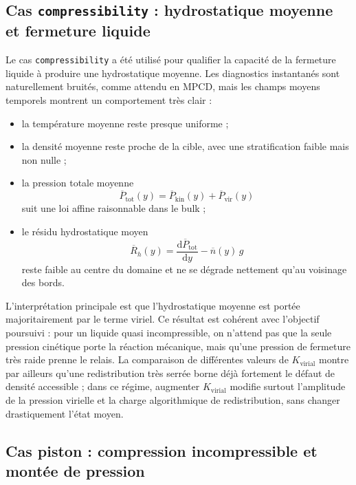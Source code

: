 \documentclass[11pt,a4paper]{article}
\begin{document}
\subsection{Cas \texttt{compressibility} : hydrostatique moyenne et fermeture liquide}

Le cas \texttt{compressibility} a été utilisé pour qualifier la capacité de la fermeture liquide à produire une hydrostatique moyenne. Les diagnostics instantanés sont naturellement bruités, comme attendu en MPCD, mais les champs moyens temporels montrent un comportement très clair :
\begin{itemize}
  \item la température moyenne reste presque uniforme ;
  \item la densité moyenne reste proche de la cible, avec une stratification faible mais non nulle ;
  \item la pression totale moyenne
  \begin{equation}
   \overline{P}_{\mathrm{tot}}(y)=\overline{P}_{\mathrm{kin}}(y)+\overline{P}_{\mathrm{vir}}(y)
  \end{equation}
  suit une loi affine raisonnable dans le bulk ;
  \item le résidu hydrostatique moyen
  \begin{equation}
   \overline{R}_h(y)=\frac{\mathrm d \overline{P}_{\mathrm{tot}}}{\mathrm d y}-\overline{n}(y)\,g
  \end{equation}
  reste faible au centre du domaine et ne se dégrade nettement qu'au voisinage des bords.
\end{itemize}

L'interprétation principale est que l'hydrostatique moyenne est portée majoritairement par le terme viriel. Ce résultat est cohérent avec l'objectif poursuivi : pour un liquide quasi incompressible, on n'attend pas que la seule pression cinétique porte la réaction mécanique, mais qu'une pression de fermeture très raide prenne le relais. La comparaison de différentes valeurs de \(K_{\mathrm{virial}}\) montre par ailleurs qu'une redistribution très serrée borne déjà fortement le défaut de densité accessible ; dans ce régime, augmenter \(K_{\mathrm{virial}}\) modifie surtout l'amplitude de la pression virielle et la charge algorithmique de redistribution, sans changer drastiquement l'état moyen.

\subsection{Cas piston : compression incompressible et montée de pression}
\end{document}
